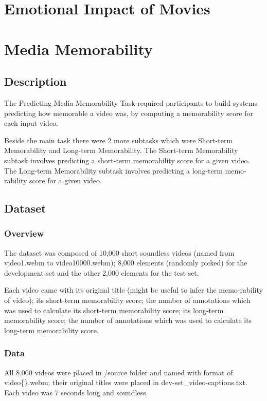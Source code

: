 {\section{Emotional Impact of Movies\cite{emotion18}}

\section{Media Memorability}
\subsection{Description}
The Predicting Media Memorability Task\cite{memo18} required participants to build systems predicting how memorable a video was, by computing a memorability score for each input video.

Beside the main task there were 2 more subtasks which were Short-term Memorability and Long-term Memorability\cite{longtermmem}. The Short-term Memorability subtask involves predicting a short-term memorability score for a given video. The Long-term Memorability subtask involves predicting a long-term memo-rability score for a given video.

\subsection{Dataset}
\subsubsection{Overview}
The dataset was composed of 10,000 short soundless videos (named from video1.webm to video10000.webm); 8,000 elements (randomly picked) for the development set and the other 2,000 elements for the test set.

Each video came with its original title (might be useful to infer the memo-rability of video); its short-term memorability score; the number of annotations which was used to calculate its short-term memorability score; its long-term memorability score; the number of annotations which was used to calculate its long-term memorability score.

\subsubsection{Data}
All 8,000 videos were placed in /source folder and named with format of video\{\}.webm; their original titles were placed in dev-set\_video-captions.txt. Each video was 7 seconds long and soundless.

}
